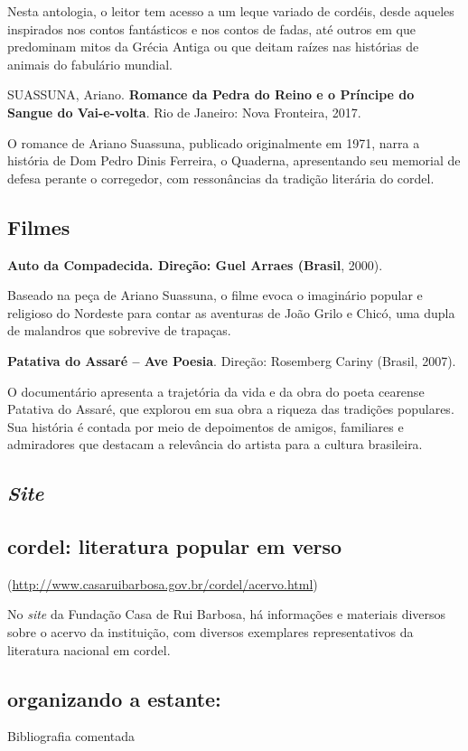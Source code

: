 \documentclass[12pt]{extarticle}
\begin{document}
Nesta antologia, o leitor tem acesso a um leque variado de cordéis,
desde aqueles inspirados nos contos fantásticos e nos contos de fadas,
até outros em que predominam mitos da Grécia Antiga ou que deitam raízes
nas histórias de animais do fabulário mundial.


  SUASSUNA, Ariano. \textbf{Romance da Pedra do Reino e o Príncipe do
  Sangue do Vai-e-volta}. Rio de Janeiro: Nova Fronteira, 2017.

O romance de Ariano Suassuna, publicado originalmente em 1971, narra a
história de Dom Pedro Dinis Ferreira, o Quaderna, apresentando seu
memorial de defesa perante o corregedor, com ressonâncias da tradição
literária do cordel.


\subsection{Filmes}

  \textbf{Auto da Compadecida. Direção: Guel Arraes (Brasil}, 2000).

Baseado na peça de Ariano Suassuna, o filme evoca o imaginário popular e
religioso do Nordeste para contar as aventuras de João Grilo e Chicó,
uma dupla de malandros que sobrevive de trapaças.


  \textbf{Patativa do Assaré -- Ave Poesia}. Direção: Rosemberg Cariny
  (Brasil, 2007).

O documentário apresenta a trajetória da vida e da obra do poeta
cearense Patativa do Assaré, que explorou em sua obra a riqueza das
tradições populares. Sua história é contada por meio de depoimentos de
amigos, familiares e admiradores que destacam a relevância do artista
para a cultura brasileira.


  \subsection{\emph{Site}}


\subsection{cordel: literatura popular em verso }

(\url{http://www.casaruibarbosa.gov.br/cordel/acervo.html})

No \emph{site} da Fundação Casa de Rui Barbosa, há informações e
materiais diversos sobre o acervo da instituição, com diversos
exemplares representativos da literatura nacional em cordel.

\subsection{organizando a estante:} Bibliografia comentada
\end{document}
